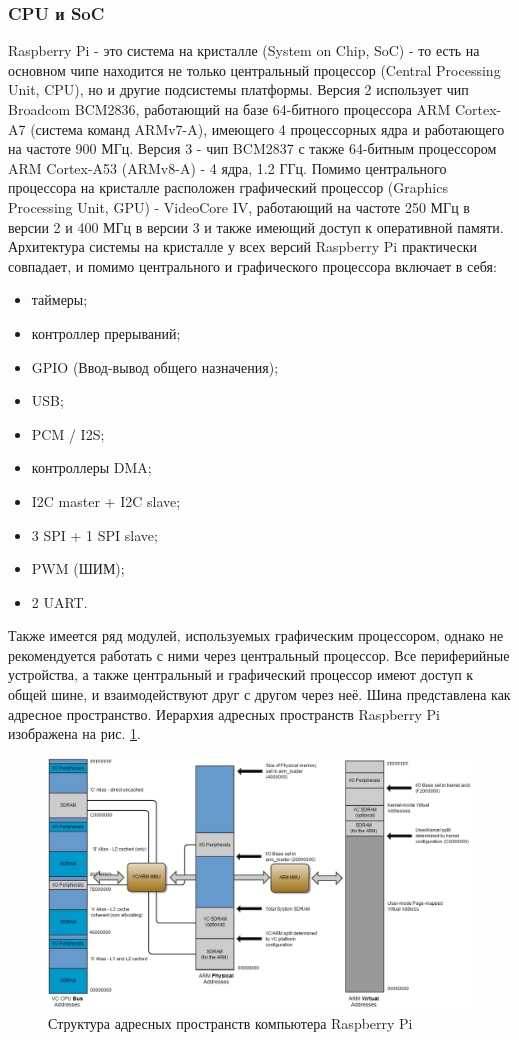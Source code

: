\documentclass[14pt,russian,a4paper]{extarticle}
\begin{document}
\subsubsection{CPU и SoC}
Raspberry Pi - это система на кристалле (System on Chip, SoC) - то есть на основном чипе находится не только центральный процессор (Central Processing Unit, CPU), но и другие подсистемы платформы. 
Версия 2 использует чип Broadcom BCM2836, работающий на базе 64-битного процессора ARM\cite{arm} Cortex-A7 (система команд ARMv7-A), имеющего 4 процессорных ядра и работающего на частоте 900 МГц.
Версия 3 - чип BCM2837 с также 64-битным процессором ARM Cortex-A53 (ARMv8-A) - 4 ядра, 1.2 ГГц. Помимо центрального процессора на кристалле расположен  графический процессор (Graphics Processing Unit, GPU) - VideoCore IV, работающий на частоте 250 МГц в версии 2 и 400 МГц в версии 3 и также имеющий доступ к оперативной памяти. Архитектура системы на кристалле\cite{raspberry_pi_peripherals} у всех версий Raspberry Pi практически совпадает, и помимо центрального и графического процессора включает в себя:
\begin{itemize}
    \item таймеры;
    \item контроллер прерываний;
    \item GPIO (Ввод-вывод общего назначения);
    \item USB;
    \item PCM / I2S;
    \item контроллеры DMA;
    \item I2C master + I2C slave;
    \item 3 SPI + 1 SPI slave;
    \item PWM (ШИМ);
    \item 2 UART.
\end{itemize}
Также имеется ряд модулей, используемых графическим процессором, однако не рекомендуется работать с ними через центральный процессор.
Все периферийные устройства, а также центральный и графический процессор имеют доступ к общей шине, и взаимодействуют друг с другом через неё. Шина представлена как адресное пространство. Иерархия адресных пространств Raspberry Pi изображена на рис. \ref{fig:rpi_mem}.

\begin{figure}[h!]
    \centerline{\includegraphics[width=400pt]{media/rpi_mem.png}}
    \caption{Структура адресных пространств компьютера Raspberry Pi}
    \label{fig:rpi_mem}
\end{figure}
\end{document}
